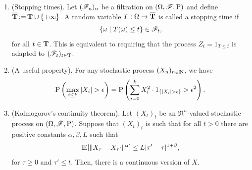 \documentclass[a4paper,10pt]{scrbook}
\begin{document}
\begin{enumerate}
 \item (Stopping times). Let $(\mathscr{F}_n)_n$ be a filtration on $(\Omega,\mathscr{F},\mathrm{P})$ and define $\overline{\mathbf{T}} {}\mathop{\mathrel{:}=}{} \mathbf{T} \cup \{+\infty\}$.
       A random variable $T: \Omega \to \overline{\mathbf{T}}$ is called a stopping time if
       \[
        \{\omega {}\mid{} T(\omega) \leq t\} \in \mathscr{F}_t,
       \]
      for all $t\in \mathbf{T}$. This is equivalent to requiring that the process $Z_t = 1_{T \leq t}$ is adapted to $(\mathscr{F}_t)_{t\in \mathbf{T}}$.
      
 \item (A useful property). For any stochastic process $(X_n)_{n\in\N}$, we have
 \[
  \prob\left(\max_{i\leq k}|X_i|>\epsilon\right) = \prob\left(\sum_{i=0}^{k}X_i^2 \cdot  1_{\{|X_i|>\epsilon\}}>\epsilon^2\right).
 \]
 \item \label{it:kolmogorov-cont-theorem} 
       (Kolmogorov's continuity theorem). Let \((X_t)_t\) be an \(\Re^{n}\)-valued stochastic process on \((\Omega,\mathscr{F},\mathrm{P})\).
       Suppose that \((X_t)_t\) is such that for all \(t>0\) there 
       are positive constants \(\alpha, \beta, L\) such that 
       \[
        \E[\|X_{\tau} - X_{\tau'}\|^\alpha] \leq L |\tau' - \tau|^{1+\beta},
       \]
       for \(\tau \geq 0\) and \(\tau' \leq t\). Then, there is a continuous version of \(X\).
\end{enumerate}
\end{document}
